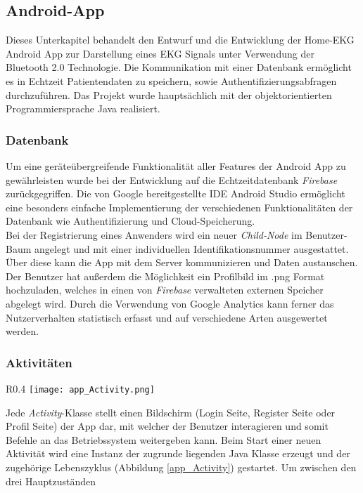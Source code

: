 \subsection{Android-App}
Dieses Unterkapitel behandelt den Entwurf und die Entwicklung der Home-EKG Android App zur Darstellung eines EKG Signals unter Verwendung der Bluetooth 2.0 Technologie. Die Kommunikation mit einer Datenbank ermöglicht es in Echtzeit Patientendaten zu speichern, sowie Authentifizierungsabfragen durchzuführen. Das Projekt wurde hauptsächlich mit der objektorientierten Programmiersprache Java realisiert. 

\subsubsection{Datenbank}
Um eine geräteübergreifende Funktionalität aller Features der Android App zu gewährleisten wurde bei der Entwicklung auf die Echtzeitdatenbank \textit{Firebase} zurückgegriffen. Die von Google bereitgestellte IDE Android Studio ermöglicht eine besonders einfache Implementierung der verschiedenen Funktionalitäten der Datenbank wie Authentifizierung und Cloud-Speicherung. \\
Bei der Registrierung eines Anwenders wird ein neuer \textit{Child-Node} im Benutzer-Baum angelegt und mit einer individuellen Identifikationsnummer ausgestattet. Über diese kann die App mit dem Server kommunizieren und Daten austauschen. \\
Der Benutzer hat außerdem die Möglichkeit ein Profilbild im .png Format hochzuladen, welches in einen von \textit{Firebase} verwalteten externen Speicher abgelegt wird. Durch die Verwendung von Google Analytics kann ferner das Nutzerverhalten statistisch erfasst und auf verschiedene Arten ausgewertet werden. 

\subsubsection{Aktivitäten}

\begin{wrapfigure}[12]{R}{0.4\textwidth}
\vspace{-25pt}
\texttt{[image: app\_Activity.png]}
\caption{Lebenszyklus}
\label{app_Activity}
\end{wrapfigure}

Jede \textit{Activity}-Klasse stellt einen Bildschirm (Login Seite, Register Seite oder Profil Seite) der App dar, mit welcher der Benutzer interagieren und somit Befehle an das Betriebssystem weitergeben kann. Beim Start einer neuen Aktivität wird eine Instanz der zugrunde liegenden Java Klasse erzeugt und der zugehörige Lebenszyklus (Abbildung \ref{app_Activity}) gestartet.
Um zwischen den drei Hauptzuständen

